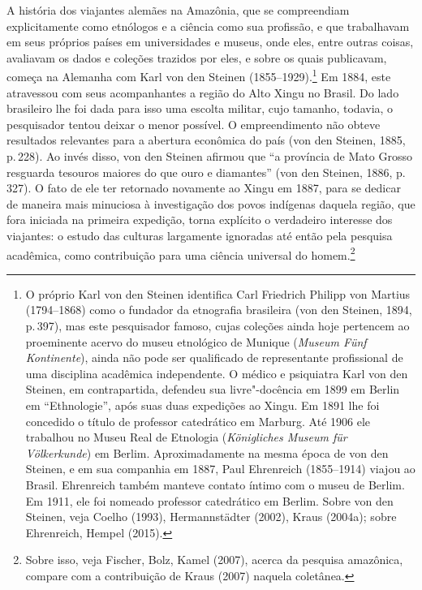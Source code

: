 A história dos viajantes alemães na Amazônia, que se compreendiam
explicitamente como etnólogos e a ciência como sua profissão, e que
trabalhavam em seus próprios países em universidades e museus, onde
eles, entre outras coisas, avaliavam os dados e coleções trazidos por
eles, e sobre os quais publicavam, começa na Alemanha com Karl von den
Steinen (1855--1929).\footnote{O próprio Karl von den Steinen identifica
  Carl Friedrich Philipp von Martius (1794--1868) como o fundador da
  etnografia brasileira (von den Steinen, 1894, p.\,397), mas este
  pesquisador famoso, cujas coleções ainda hoje pertencem ao proeminente
  acervo do museu etnológico de Munique (\textit{Museum Fünf Kontinente}),
  ainda não pode ser qualificado de representante profissional de uma
  disciplina acadêmica independente. O médico e psiquiatra Karl von den
  Steinen, em contrapartida, defendeu sua livre"-docência em 1899 em
  Berlin em ``Ethnologie'', após suas duas expedições ao Xingu. Em 1891
  lhe foi concedido o título de professor catedrático em Marburg. Até
  1906 ele trabalhou no Museu Real de Etnologia (\textit{Königliches
  Museum für Völkerkunde}) em Berlim. Aproximadamente na mesma época de
  von den Steinen, e em sua companhia em 1887, Paul Ehrenreich
  (1855--1914) viajou ao Brasil. Ehrenreich também manteve contato íntimo
  com o museu de Berlim. Em 1911, ele foi nomeado professor catedrático
  em Berlim. Sobre von den Steinen, veja Coelho (1993), Hermannstädter
  (2002), Kraus (2004a); sobre Ehrenreich, Hempel (2015).} Em 1884, este
atravessou com seus acompanhantes a região do Alto Xingu no Brasil. Do
lado brasileiro lhe foi dada para isso uma escolta militar, cujo
tamanho, todavia, o pesquisador tentou deixar o menor possível. O
empreendimento não obteve resultados relevantes para a abertura
econômica do país (von den Steinen, 1885, p.\,228). Ao invés disso, von
den Steinen afirmou que ``a província de Mato Grosso resguarda tesouros
maiores do que ouro e diamantes'' (von den Steinen, 1886, p.\,327). O
fato de ele ter retornado novamente ao Xingu em 1887, para se dedicar de
maneira mais minuciosa à investigação dos povos indígenas daquela
região, que fora iniciada na primeira expedição, torna explícito o
verdadeiro interesse dos viajantes: o estudo das culturas largamente
ignoradas até então pela pesquisa acadêmica, como contribuição para uma
ciência universal do homem.\footnote{Sobre isso, veja Fischer, Bolz,
  Kamel (2007), acerca da pesquisa amazônica, compare com a
  contribuição de Kraus (2007) naquela coletânea.}

